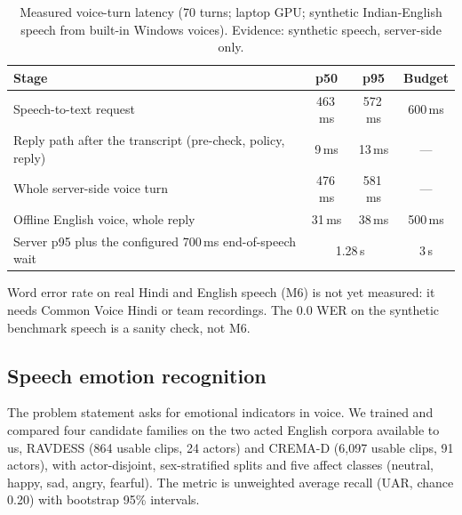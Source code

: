 \begin{table}[!htbp]
\centering\small
\caption{Measured voice-turn latency (70 turns; laptop GPU; synthetic Indian-English speech from
built-in Windows voices). Evidence: synthetic speech, server-side only.}
\label{tab:m2}
\begin{tabular}{@{}lccc@{}}
\toprule
Stage & p50 & p95 & Budget \\
\midrule
Speech-to-text request & 463\,ms & 572\,ms & 600\,ms \\
Reply path after the transcript (pre-check, policy, reply) & 9\,ms & 13\,ms & --- \\
Whole server-side voice turn & 476\,ms & 581\,ms & --- \\
Offline English voice, whole reply & 31\,ms & 38\,ms & 500\,ms \\
\midrule
Server p95 plus the configured 700\,ms end-of-speech wait & \multicolumn{2}{c}{1.28\,s} & 3\,s \\
\bottomrule
\end{tabular}
\end{table}

Word error rate on real Hindi and English speech (M6) is not yet measured: it needs Common Voice
Hindi or team recordings. The 0.0 WER on the synthetic benchmark speech is a sanity check, not M6.

\subsection{Speech emotion recognition}
\label{sec:ser}
The problem statement asks for emotional indicators in voice. We trained and compared four candidate
families on the two acted English corpora available to us, RAVDESS (864 usable clips, 24 actors) and
CREMA-D (6{,}097 usable clips, 91 actors), with actor-disjoint, sex-stratified splits and five affect
classes (neutral, happy, sad, angry, fearful). The metric is unweighted average recall (UAR, chance
0.20) with bootstrap 95\% intervals.

